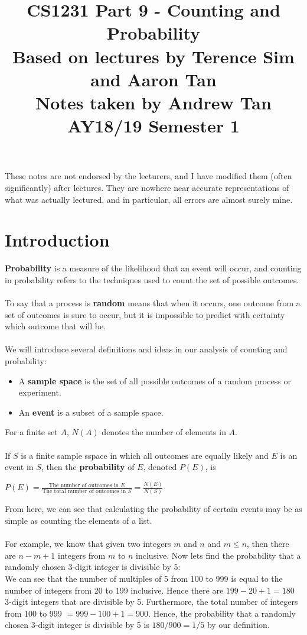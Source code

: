 \documentclass[a4paper]{article}
\title{%
	CS1231 Part 9 - Counting and Probability  \\
	\large Based on lectures by Terence Sim and Aaron Tan
	\\ Notes taken by Andrew Tan
	\\ AY18/19 Semester 1
	\\ }
\author{}
\date{\vspace{-5ex}}
\begin{document}
\maketitle

\begin{center}\begin{minipage}[c]{0.9\textwidth}\centering\footnotesize These notes are not endorsed by the lecturers, and I have modified them (often significantly) after lectures. They are nowhere near accurate representations of what was actually lectured, and in particular, all errors are almost surely mine.\end{minipage}\end{center}

\section{Introduction}
\textbf{Probability} is a measure of the likelihood that an event will occur, and counting in probability refers to the techniques used to count the set of possible outcomes.\\ \\
To say that a process is \textbf{random} means that when it occurs, one outcome from a set of outcomes is sure to occur, but it is impossible to predict with certainty which outcome that will be. \\ \\
We will introduce several definitions and ideas in our analysis of counting and probability:
\begin{itemize}
	\item A \textbf{sample space} is the set of all possible outcomes of a random process or experiment.
	\item An \textbf{event} is a subset of a sample space.
\end{itemize}
For a finite set $A$, $N(A)$ denotes the number of elements in $A$.\\ \\
If $S$ is a finite sample sspace in which all outcomes are equally likely and $E$ is an event in $S$, then the \textbf{probability} of $E$, denoted $P(E)$, is
\begin{center}
	$P(E) = \frac{\text{The number of outcomes in }E}{\text{The total number of outcomes in }S} = \frac{N(E)}{N(S)}$
\end{center}
From here, we can see that calculating the probability of certain events may be as simple as counting the elements of a list.\\\\
For example, we know that given two integers $m$ and $n$ and $m \le n$, then there are $n-m+1$ integers from $m$ to $n$ inclusive. Now lets find the probability that a randomly chosen 3-digit integer is divisible by 5:\\
We can see that the number of multiples of 5 from 100 to 999 is equal to the number of integers from 20 to 199 inclusive. Hence there are $199-20+1 = 180$ 3-digit integers that are divisible by 5. Furthermore, the total number of integers from 100 to 999 $=999-100+1 = 900$. Hence, the probability that a randomly chosen 3-digit integer is divisible by 5 is $180/900 = 1/5$ by our definition.
\end{document}
